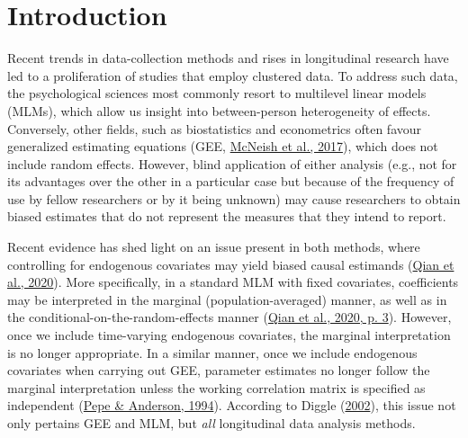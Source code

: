 \documentclass[
  12pt,
  a4paper,
]{article}
\begin{document}
\pagestyle{fancy}
  \fancyhead{}


\newpage

\hypertarget{introduction}{%
\section{Introduction}\label{introduction}}

Recent trends in data-collection methods and rises in longitudinal
research have led to a proliferation of studies that employ clustered
data. To address such data, the psychological sciences most commonly
resort to multilevel linear models (MLMs), which allow us insight into
between-person heterogeneity of effects. Conversely, other fields, such
as biostatistics and econometrics often favour generalized estimating
equations (GEE, \protect\hyperlink{ref-mcneish2017}{McNeish et al.,
2017}), which does not include random effects. However, blind
application of either analysis (e.g., not for its advantages over the
other in a particular case but because of the frequency of use by fellow
researchers or by it being unknown) may cause researchers to obtain
biased estimates that do not represent the measures that they intend to
report.

Recent evidence has shed light on an issue present in both methods,
where controlling for endogenous covariates may yield biased causal
estimands (\protect\hyperlink{ref-qian2020}{Qian et al., 2020}). More
specifically, in a standard MLM with fixed covariates, coefficients may
be interpreted in the marginal (population-averaged) manner, as well as
in the conditional-on-the-random-effects manner
(\protect\hyperlink{ref-qian2020}{Qian et al., 2020, p. 3}). However,
once we include time-varying endogenous covariates, the marginal
interpretation is no longer appropriate. In a similar manner, once we
include endogenous covariates when carrying out GEE, parameter estimates
no longer follow the marginal interpretation unless the working
correlation matrix is specified as independent
(\protect\hyperlink{ref-pepe1994}{Pepe \& Anderson, 1994}). According to
Diggle (\protect\hyperlink{ref-diggle2002}{2002}), this issue not only
pertains GEE and MLM, but \emph{all} longitudinal data analysis methods.
\end{document}
